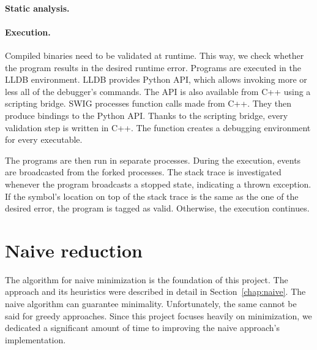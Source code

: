 \paragraph{Static analysis.}

\paragraph{Execution.} Compiled binaries need to be validated at runtime.
This way, we check whether the program results in the desired runtime error.
Programs are executed in the LLDB environment.
LLDB provides Python API, which allows invoking more or less all of 
the debugger's commands.
The API is also available from C++ using a scripting bridge.
SWIG processes function calls made from C++.
They then produce bindings to the Python API.
Thanks to the scripting bridge, every validation step is written in C++.
The  function creates a debugging environment for every 
executable.

The programs are then run in separate processes.
During the execution, events are broadcasted from the forked processes.
The stack trace is investigated whenever the program broadcasts a stopped 
state, indicating a thrown exception.
If the symbol's location on top of the stack trace is the same as the one of 
the desired error, the program is tagged as valid.
Otherwise, the execution continues.

\section{Naive reduction}

The algorithm for naive minimization is the foundation of this project. 
The approach and its heuristics were described in detail in 
Section~\ref{chap:naive}. 
The naive algorithm can guarantee minimality. Unfortunately, the same 
cannot be said for greedy approaches. 
Since this project focuses heavily on minimization, we dedicated 
a significant amount of time to improving the naive approach's 
implementation.

